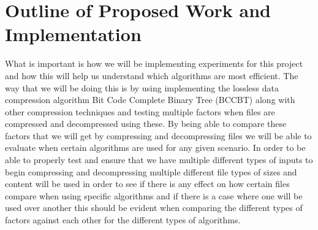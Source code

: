 \documentclass[11pt]{article}
\begin{document}
\newpage
\section*{Outline of Proposed Work and Implementation}
What is important is how we will be implementing experiments for this project and how this will
help us understand which algorithms are most efficient.  The way that we will be doing this is by
using implementing the lossless data compression algorithm Bit Code Complete Binary Tree (BCCBT) 
along with other compression techniques and testing multiple factors when files are compressed and 
decompressed using these.  By being able to compare these factors that we will get by compressing and
decompressing files we will be able to evaluate when certain algorithms are used for any given scenario.
In order to be able to properly test and ensure that we have multiple different types of inputs to begin 
compressing and decompressing multiple different file types of sizes and content will be used in order to 
see if there is any effect on how certain files compare when using specific algorithms and if there is a case
where one will be used over another this should be evident when comparing the different types of 
factors against each other for the different types of algorithms.
\end{document}
